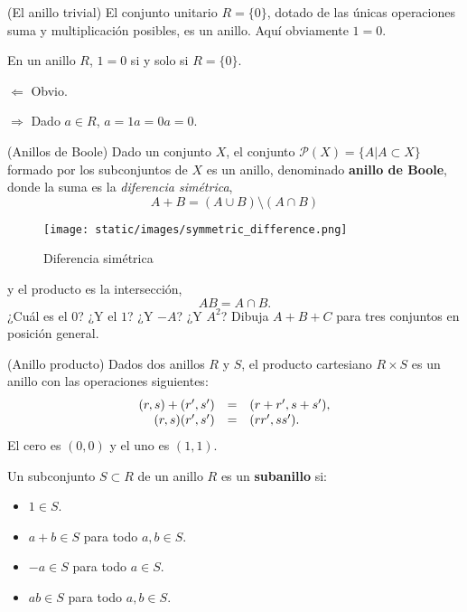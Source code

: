 \textrm{\normalfont (El anillo trivial)} El conjunto
unitario \(R=\{0\}\), dotado de las únicas operaciones suma y
multiplicación posibles, es un anillo. Aquí obviamente \(1=0\).


En un anillo \(R\), \(1=0\) si y solo si \(R=\{0\}\).


\(\Leftarrow\) Obvio.

\(\Rightarrow\) Dado \(a\in R\), \(a=1a=0a=0\).


\textrm{\normalfont (Anillos de Boole)} Dado un conjunto
\(X\), el conjunto \(\mathcal P(X)=\{A|A \subset X\}\) formado por los
subconjuntos de \(X\) es un anillo, denominado \textbf{anillo de Boole},
donde la suma es la \emph{diferencia simétrica},
\[A+B=(A\cup B)\setminus (A\cap B)\]

\begin{figure}
\centering
\texttt{[image: static/images/symmetric\_difference.png]}
\caption{Diferencia simétrica}
\end{figure}

y el producto es la intersección, \[AB=A\cap B.\] ¿Cuál es el \(0\)? ¿Y
el \(1\)? ¿Y \(-A\)? ¿Y \(A^2\)? Dibuja \(A+B+C\) para tres conjuntos en
posición general. 

\textrm{\normalfont (Anillo producto)} Dados dos anillos
\(R\) y \(S\), el producto cartesiano \(R\times S\) es un anillo con las
operaciones siguientes: \[
\begin{array}{rcl}
(r,s)+(r',s')&=&(r+r',s+s'),\cr
(r,s)(r',s')&=&(rr',ss').
\end{array}
\] El cero es \((0,0)\) y el uno es \((1,1)\). 


Un subconjunto \(S\subset R\) de un anillo \(R\) es un
\textbf{subanillo} si:

\begin{itemize}
\item
  \(1\in S\).
\item
  \(a+b\in S\) para todo \(a,b\in S\).
\item
  \(-a\in S\) para todo \(a\in S\).
\item
  \(ab\in S\) para todo \(a,b\in S\).
\end{itemize}


